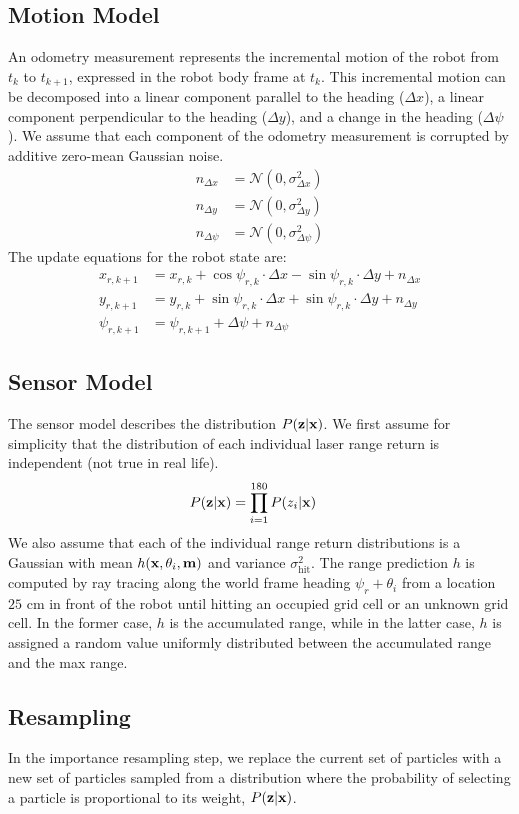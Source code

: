 \subsection{Motion Model}
\label{sec:motion_model}
An odometry measurement represents the incremental motion of the robot from $t_k$ to $t_{k+1}$, expressed in the robot body frame at $t_k$.
This incremental motion can be decomposed into a linear component parallel to the heading ($\Delta x$), a linear component perpendicular to the heading ($\Delta y$), and a change in the heading ($\Delta \psi$).
We assume that each component of the odometry measurement is corrupted by additive zero-mean Gaussian noise.
\begin{align}
  n_{\Delta x} &= \mathcal{N}(0, \sigma_{\Delta x}^2 ) \\
  n_{\Delta y} &= \mathcal{N}(0, \sigma_{\Delta y}^2 ) \\
  n_{\Delta \psi} &= \mathcal{N}(0, \sigma_{\Delta \psi}^2 )
\end{align}
The update equations for the robot state are:
\begin{align}
  x_{r,k+1} &= x_{r,k} + \cos \psi_{r,k} \cdot \Delta x - \sin \psi_{r,k} \cdot \Delta y + n_{\Delta x} \\
  y_{r,k+1} &= y_{r,k} + \sin \psi_{r,k} \cdot \Delta x + \sin \psi_{r,k} \cdot \Delta y + n_{\Delta y} \\
  \psi_{r,k+1} &= \psi_{r,k+1} + \Delta \psi + n_{\Delta \psi}
\end{align}

\subsection{Sensor Model}
\label{sec:sensor_model}
The sensor model describes the distribution $P(\mathbf{z} | \mathbf{x})$.
We first assume for simplicity that the distribution of each individual laser range return is independent (not true in real life).
\begin{align}
  P(\mathbf{z} | \mathbf{x}) &= \prod_{i=1}^{180} P(z_i | \mathbf{x}) \label{eq:pzx_indep}
\end{align}
We also assume that each of the individual range return distributions is a Gaussian with mean $h(\mathbf{x},\theta_i, \mathbf{m})$ and variance $\sigma_\text{hit}^2$.
The range prediction $h$ is computed by ray tracing along the world frame heading $\psi_r + \theta_i$ from a location $25$ cm in front of the robot until hitting an occupied grid cell or an unknown grid cell.
In the former case, $h$ is the accumulated range, while in the latter case, $h$ is assigned a random value uniformly distributed between the accumulated range and the max range.


\subsection{Resampling}
In the importance resampling step, we replace the current set of particles with a new set of particles sampled from a distribution where the probability of selecting a particle is proportional to its weight, $P(\mathbf{z} | \mathbf{x})$.
